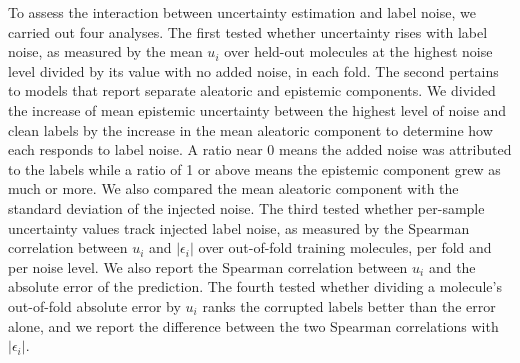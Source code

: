 To assess the interaction between uncertainty estimation and label noise, we carried out four analyses. The first tested whether uncertainty rises with label noise, as measured by the mean $u_i$ over held-out molecules at the highest noise level
divided by its value with no added noise, in each fold. The second pertains to models that report separate aleatoric and epistemic components. We divided the increase of mean epistemic uncertainty between the highest level of noise and clean labels by the increase in the mean aleatoric component to determine how each responds to label noise. A ratio near 0 means the added noise was attributed to the labels while a ratio of 1 or above means the epistemic component grew as much or more. We also compared the mean aleatoric component with the standard deviation of the injected noise. The third tested whether per-sample uncertainty values track injected label noise, as measured by the Spearman correlation between $u_i$ and $|\epsilon_i|$ over out-of-fold training molecules, per fold and per noise level. We also report the Spearman correlation between $u_i$ and the absolute error of the prediction. The fourth tested whether dividing a molecule's out-of-fold absolute error by $u_i$ ranks the corrupted labels better than the error alone, and we report the difference between the two Spearman correlations with $|\epsilon_i|$.


